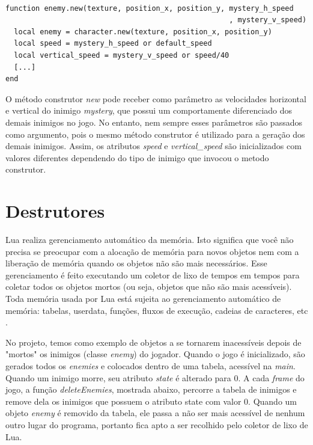\documentclass[rel_mlp]{iiufrgs}
\begin{document}
\clearpage

\begin{lstlisting}

function enemy.new(texture, position_x, position_y, mystery_h_speed
													, mystery_v_speed)
  local enemy = character.new(texture, position_x, position_y)
  local speed = mystery_h_speed or default_speed
  local vertical_speed = mystery_v_speed or speed/40
  [...]
end

\end{lstlisting}

O método construtor \textit{new} pode receber como parâmetro as velocidades horizontal e vertical do inimigo \textit{mystery}, que possui um comportamente diferenciado dos demais inimigos no jogo. No entanto, nem sempre esses parâmetros são passados como argumento, pois o mesmo método construtor é utilizado para a geração dos demais inimigos. Assim, os atributos \textit{speed} e \textit{vertical\_speed} são inicializados com valores diferentes dependendo do tipo de inimigo que invocou o metodo construtor.


\section{Destrutores}

Lua realiza gerenciamento automático da memória. Isto significa que você não precisa se preocupar com a alocação de memória para novos objetos nem com a liberação de memória quando os objetos não são mais necessários. Esse gerenciamento é feito executando um coletor de lixo de tempos em tempos para coletar todos os objetos mortos (ou seja, objetos que não são mais acessíveis). Toda memória usada por Lua está sujeita ao gerenciamento automático de memória: tabelas, userdata, funções, fluxos de execução, cadeias de caracteres, etc \cite{ManualLua}.

No projeto, temos como exemplo de objetos a se tornarem inacessíveis depois de "mortos" os inimigos (classe \textit{enemy}) do jogador. Quando o jogo é inicializado, são gerados todos os \textit{enemies} e colocados dentro de uma tabela, acessível na \textit{main}. Quando um inimigo morre, seu atributo \textit{state} é alterado para 0. A cada \textit{frame} do jogo, a função \textit{deleteEnemies}, mostrada abaixo, percorre a tabela de inimigos e remove dela os inimigos que possuem o atributo state com valor 0. Quando um objeto \textit{enemy} é removido da tabela, ele passa a não ser mais acessível de nenhum outro lugar do programa, portanto fica apto a ser recolhido pelo coletor de lixo de Lua.
\end{document}
